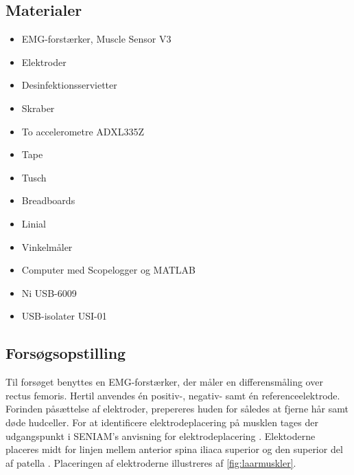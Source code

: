 \subsection{Materialer} 
\begin{itemize}
\item EMG-forstærker, Muscle Sensor V3
\item Elektroder
\item Desinfektionsservietter
\item Skraber
\item To accelerometre ADXL335Z
\item Tape
\item Tusch
\item Breadboards
\item Linial 
\item Vinkelmåler
\item Computer med Scopelogger og MATLAB
\item Ni USB-6009
\item USB-isolater USI-01
\end{itemize}

\subsection{Forsøgsopstilling}

Til forsøget benyttes en EMG-forstærker, der måler en differensmåling over rectus femoris. Hertil anvendes én positiv-, negativ- samt én referenceelektrode. Forinden påsættelse af elektroder, prepereres huden for således at fjerne hår samt døde hudceller.
For at identificere elektrodeplacering på musklen tages der udgangspunkt i SENIAM's anvisning for elektrodeplacering \citep{seniam2016}. 
Elektoderne placeres midt for linjen mellem anterior spina iliaca superior og den superior del af patella \citep{seniam2016}. Placeringen af elektroderne illustreres af \autoref{fig:laarmuskler}.

